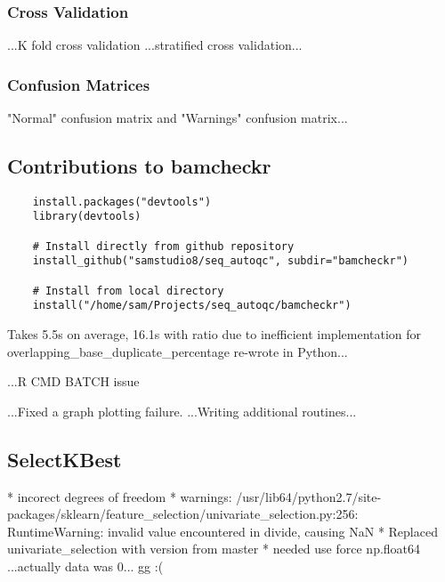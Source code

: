 \subsubsection{Cross Validation}
...K fold cross validation
...stratified cross validation...

\subsubsection{Confusion Matrices}
"Normal" confusion matrix and "Warnings" confusion matrix...

\subsection{Contributions to bamcheckr}
\begin{verbatim}
    install.packages("devtools")
    library(devtools)

    # Install directly from github repository
    install_github("samstudio8/seq_autoqc", subdir="bamcheckr")

    # Install from local directory
    install("/home/sam/Projects/seq_autoqc/bamcheckr")

\end{verbatim}
Takes 5.5s on average, 16.1s with ratio due to inefficient implementation
for overlapping\_base\_duplicate\_percentage
re-wrote in Python...


...R CMD BATCH issue

...Fixed a graph plotting failure.
...Writing additional routines...

\subsection{SelectKBest}
* incorect degrees of freedom
* warnings: /usr/lib64/python2.7/site-packages/sklearn/feature\_selection/univariate\_selection.py:256: RuntimeWarning: invalid value encountered in divide, causing NaN
* Replaced univariate\_selection with version from master
* needed use force np.float64
...actually data was 0... gg :(

